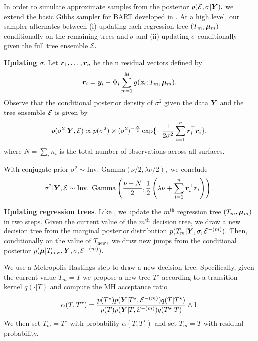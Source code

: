 
In order to simulate approximate samples from the posterior $p(\mathcal{E}, \sigma \vert \bm{Y}),$ we extend the basic Gibbs sampler for BART developed in \citet{Chipman2010}.
At a high level, our sampler alternates between (i) updating each regression tree $(T_{m}, \boldsymbol{\mu}_{m})$ conditionally on the remaining trees and $\sigma$ and (ii) updating $\sigma$ conditionally given the full tree ensemble $\mathcal{E}.$


\textbf{Updating $\sigma$}. Let $\bm{r}_{1}, \ldots, \bm{r}_{n}$ be the n residual vectors defined by
$$
\bm{r}_{i} = \bm{y}_{i} - \Phi_{i}\sum_{m = 1}^{M}{g(\bm{z}_{i}; T_{m}, \boldsymbol{\mu}_{m})}.
$$
Observe that the conditional posterior density of $\sigma^{2}$ given the data $\bm{Y}$ and the tree ensemble $\mathcal{E}$ is given by
$$
p(\sigma^{2} \vert \bm{Y}, \mathcal{E}) \propto p(\sigma^{2})\times(\sigma^{2})^{-\frac{N}{2}}\exp\{-\frac{1}{2\sigma^{2}}\sum_{i = 1}^{n}{\bm{r}_{i}^{\top}\bm{r}_{i}}\},
$$
where $N = \sum_{i}{n_{i}}$ is the total number of observations across all surfaces.

With conjugate prior $\sigma^{2} \sim \text{Inv. Gamma}(\nu/2, \lambda\nu/2),$ we conclude
$$
\sigma^{2} \vert \bm{Y}, \mathcal{E} \sim \text{Inv. Gamma}\left(\frac{\nu + N}{2}, \frac{1}{2}\left(\lambda\nu + \sum_{i = 1}^{n}{\bm{r}_{i}^{\top}\bm{r}_{i}}\right)\right).
$$



\textbf{Updating regression trees}. 
Like \citet{Chipman2010}, we update the $m^{\text{th}}$ regression tree $(T_{m}, \boldsymbol{\mu}_{m})$ in two steps.
Given the current value of the $m^{\text{th}}$ decision tree, we draw a new decision tree from the marginal posterior distribution $p(T_{m} \vert \bm{Y}, \sigma, \mathcal{E}^{-(m)}).$
Then, conditionally on the value of $T_{\text{new}},$ we draw new jumps from the conditional posterior $p(\boldsymbol{\mu} \vert T_{\text{new}}, \bm{Y}, \sigma, \mathcal{E}^{-(m)}).$

We use a Metropolis-Hastings step to draw a new decision tree.
Specifically, given the current value $T_{m} = T$ we propose a new tree $T^{\star}$ according to a transition kernel $q(\cdot \vert T)$ and compute the MH acceptance ratio
\begin{equation}
\label{eq:mh_ratio}
\alpha(T, T^{\star}) = \frac{p(T^{\star})p(\bm{Y} \vert T^{\star}, \mathcal{E}^{-(m)})q(T \vert T^{\star})}{p(T)p(\bm{Y} \vert T, \mathcal{E}^{-(m)})q(T^{\star} \vert T)} \wedge 1
\end{equation}
We then set $T_{m} = T^{\star}$ with probability $\alpha(T, T^{\star})$ and set $T_{m} = T$ with residual probability.

